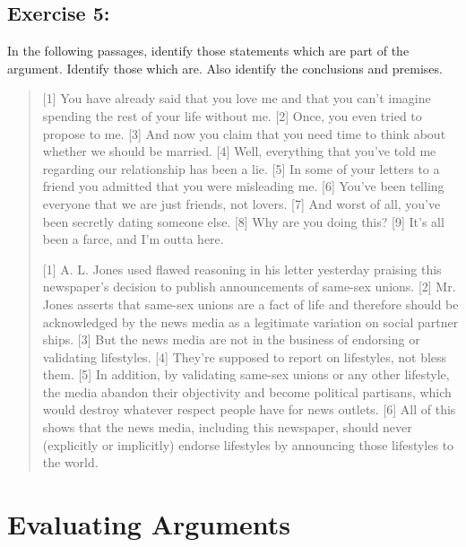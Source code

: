 \documentclass[report,oneside]{memoir}
\begin{document}
\subsection{Exercise 5:}
\label{exercise5:}

In the following passages, identify those statements which are part of the argument. Identify those which are. Also identify the conclusions and premises. 

\begin{quote}

[1] You have already said that you love me and that you can't imagine spending the rest of your life without me. [2] Once, you even tried to propose to me. [3] And now you claim that you need time to think about whether we should be married. [4] Well, everything that you've told me regarding our relationship has been a lie. [5] In some of your letters to a friend you admitted that you were misleading me. [6] You've been telling everyone that we are just friends, not lovers. [7] And worst of all, you've been secretly dating someone else. [8] Why are you doing this? [9] It's all been a farce, and I'm outta here.

[1] A. L. Jones used flawed reasoning in his letter yesterday praising this newspaper's decision to publish announcements of same-sex unions. [2] Mr. Jones asserts that same-sex unions are a fact of life and therefore should be acknowledged by the news media as a legitimate variation on social partner ships. [3] But the news media are not in the business of endorsing or validating lifestyles. [4] They're supposed to report on lifestyles, not bless them. [5] In addition, by validating same-sex unions or any other lifestyle, the media abandon their objectivity and become political partisans, which would destroy whatever respect people have for news outlets. [6] All of this shows that the news media, including this newspaper, should never (explicitly or implicitly) endorse lifestyles by announcing those lifestyles to the world.
\end{quote}

\section{Evaluating Arguments}
\label{evaluatingarguments}
\end{document}
